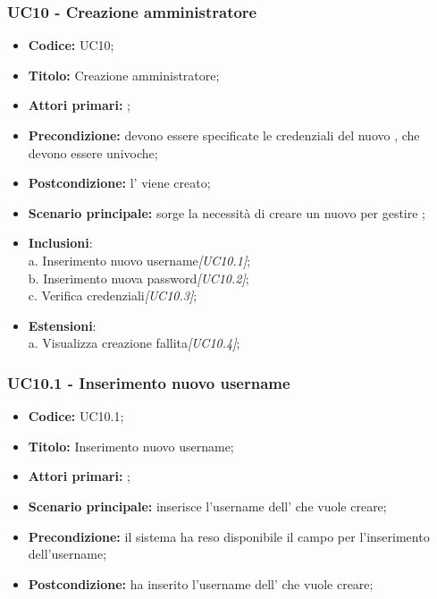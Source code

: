 \documentclass[casi-duso]{subfiles}
\begin{document}
\subsubsection{UC10 - Creazione amministratore}
\label{subsub:UC10}
\begin{itemize}
  \item \textbf{Codice:} UC10;
  \item \textbf{Titolo:} Creazione amministratore;
  \item \textbf{Attori primari:} ;
  \item \textbf{Precondizione:} devono essere specificate le credenziali del nuovo , che devono essere univoche;
  \item \textbf{Postcondizione:} l' viene creato;
  \item \textbf{Scenario principale:} sorge la necessità di creare un nuovo  per gestire ;
  \item \textbf{Inclusioni}:
        \\a. Inserimento nuovo username\emph{[UC10.1]};
        \\b. Inserimento nuova password\emph{[UC10.2]};
        \\c. Verifica credenziali\emph{[UC10.3]};
  \item \textbf{Estensioni}:
        \\a. Visualizza creazione fallita\emph{[UC10.4]};
\end{itemize}


\subsubsection{UC10.1 - Inserimento nuovo username}
\label{subsub:UC10.1}
\begin{itemize}
  \item \textbf{Codice:} UC10.1;
  \item \textbf{Titolo:} Inserimento nuovo username;
  \item \textbf{Attori primari:} ;
  \item \textbf{Scenario principale:}  inserisce l'username dell' che vuole creare;
  \item \textbf{Precondizione:} il sistema ha reso disponibile il campo per l'inserimento dell'username;
  \item \textbf{Postcondizione:}  ha inserito l'username dell' che vuole creare;
\end{itemize}
\end{document}
